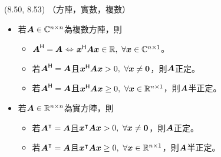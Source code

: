 \item \begin{theorem}{(8.50, 8.53)} （方陣，實數，複數）
	\begin{itemize}
		\item 若$\boldsymbol{A} \in \mathbb{C}^{n \times n}$為複數方陣，則
		\begin{itemize}
			\item $\boldsymbol{A}^{\mathsf{H}} = \boldsymbol{A}$$\iff$$\boldsymbol{x}^{\mathsf{H}}\boldsymbol{A}\boldsymbol{x} \in \mathbb{R}, \ \forall \boldsymbol{x} \in \mathbb{C}^{n \times 1}$。
			\item 若$\boldsymbol{A}^{\mathsf{H}} = \boldsymbol{A}$且$\boldsymbol{x}^{\mathsf{H}}\boldsymbol{A}\boldsymbol{x} > 0, \ \forall \boldsymbol{x} \neq \boldsymbol{0}$，則$\boldsymbol{A}$正定。
			\item 若$\boldsymbol{A}^{\mathsf{H}} = \boldsymbol{A}$且$\boldsymbol{x}^{\mathsf{H}}\boldsymbol{A}\boldsymbol{x} \ge 0, \ \forall \boldsymbol{x} \in \mathbb{R}^{n \times 1}$，則$\boldsymbol{A}$半正定。
		\end{itemize}
		\item 若$\boldsymbol{A} \in \mathbb{R}^{n \times n}$為實方陣，則
		\begin{itemize}
			\item 若$\boldsymbol{A}^\intercal = \boldsymbol{A}$且$\boldsymbol{x}^\intercal\boldsymbol{A}\boldsymbol{x} > 0, \ \forall \boldsymbol{x} \neq \boldsymbol{0}$，則$\boldsymbol{A}$正定。
			\item 若$\boldsymbol{A}^\intercal = \boldsymbol{A}$且$\boldsymbol{x}^\intercal\boldsymbol{A}\boldsymbol{x} \ge 0, \ \forall \boldsymbol{x} \in \mathbb{R}^{n \times 1}$，則$\boldsymbol{A}$半正定。
		\end{itemize}
	\end{itemize}
\end{theorem}

